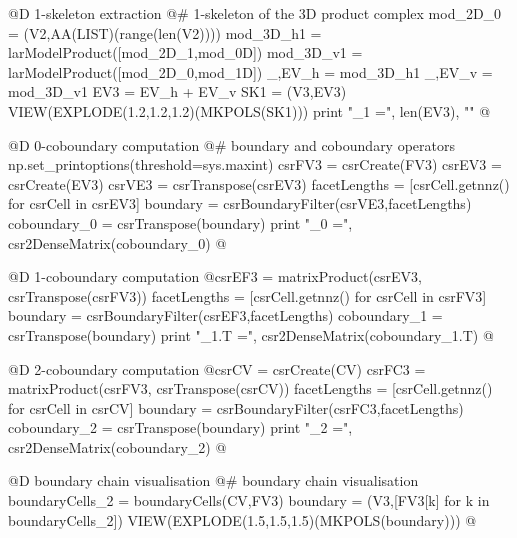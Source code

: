 \documentclass[11pt,oneside]{article}    %
\begin{document}
@D 1-skeleton extraction 
@{# 1-skeleton of the 3D product complex 
mod_2D_0 = (V2,AA(LIST)(range(len(V2))))
mod_3D_h1 = larModelProduct([mod_2D_1,mod_0D])
mod_3D_v1 = larModelProduct([mod_2D_0,mod_1D])
_,EV_h = mod_3D_h1
_,EV_v = mod_3D_v1
EV3 = EV_h + EV_v
SK1 = (V3,EV3)
VIEW(EXPLODE(1.2,1.2,1.2)(MKPOLS(SK1)))
print "\nk_1 =", len(EV3), "\n"
@}

@D 0-coboundary computation
@{# boundary and coboundary operators
np.set_printoptions(threshold=sys.maxint)
csrFV3 = csrCreate(FV3)
csrEV3 = csrCreate(EV3)
csrVE3 = csrTranspose(csrEV3)
facetLengths = [csrCell.getnnz() for csrCell in csrEV3]
boundary = csrBoundaryFilter(csrVE3,facetLengths)
coboundary_0 = csrTranspose(boundary)
print "\ncoboundary_0 =\n", csr2DenseMatrix(coboundary_0)
@}

@D 1-coboundary computation
@{csrEF3 = matrixProduct(csrEV3, csrTranspose(csrFV3))
facetLengths = [csrCell.getnnz() for csrCell in csrFV3]
boundary = csrBoundaryFilter(csrEF3,facetLengths)
coboundary_1 = csrTranspose(boundary)
print "\ncoboundary_1.T =\n", csr2DenseMatrix(coboundary_1.T)
@}

@D 2-coboundary computation
@{csrCV = csrCreate(CV)
csrFC3 = matrixProduct(csrFV3, csrTranspose(csrCV))
facetLengths = [csrCell.getnnz() for csrCell in csrCV]
boundary = csrBoundaryFilter(csrFC3,facetLengths)
coboundary_2 = csrTranspose(boundary)
print "\ncoboundary_2 =\n", csr2DenseMatrix(coboundary_2)
@}

@D boundary chain visualisation
@{# boundary chain visualisation
boundaryCells_2 = boundaryCells(CV,FV3)
boundary = (V3,[FV3[k] for k in boundaryCells_2])
VIEW(EXPLODE(1.5,1.5,1.5)(MKPOLS(boundary)))
@}
\end{document}
